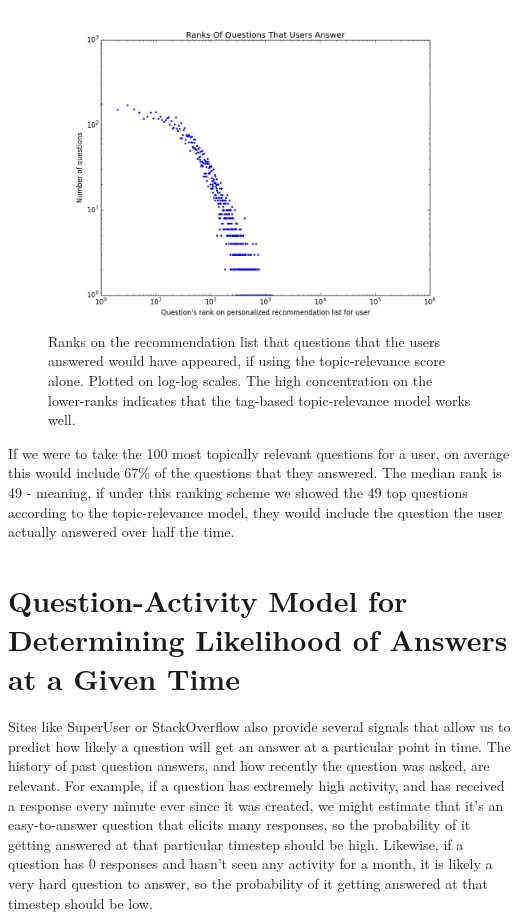 \documentclass[a4paper]{article}
\begin{document}
\begin{figure}[ht]
\centering
\includegraphics[width=\columnwidth]{RanksOfQuestions}
\caption{Ranks on the recommendation list that questions that the users answered would have appeared, if using the topic-relevance score alone. Plotted on log-log scales. The high concentration on the lower-ranks indicates that the tag-based topic-relevance model works well.}
\label{fig:ranks-of-questions}
\end{figure}

If we were to take the 100 most topically relevant questions for a user, on average this would include 67\% of the questions that they answered. The median rank is 49 - meaning, if under this ranking scheme we showed the 49 top questions according to the topic-relevance model, they would include the question the user actually answered over half the time. %

\section{Question-Activity Model for Determining Likelihood of Answers at a Given Time}

Sites like SuperUser or StackOverflow also provide several signals that allow us to predict how likely a question will get an answer at a particular point in time. The history of past question answers, and how recently the question was asked, are relevant. For example, if a question has extremely high activity, and has received a response every minute ever since it was created, we might estimate that it's an easy-to-answer question that elicits many responses, so the probability of it getting answered at that particular timestep should be high. Likewise, if a question has 0 responses and hasn't seen any activity for a month, it is likely a very hard question to answer, so the probability of it getting answered at that timestep should be low.
\end{document}
